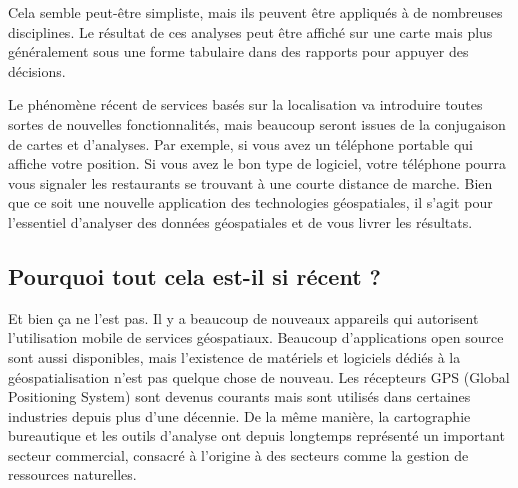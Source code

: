 Cela semble peut-\^etre simpliste, mais ils peuvent \^etre appliqu\'es \`a de nombreuses disciplines. Le r\'esultat de ces analyses peut \^etre affich\'e sur une carte mais plus g\'en\'eralement sous une forme tabulaire dans des rapports pour appuyer des d\'ecisions.

Le ph\'enom\`ene r\'ecent de services bas\'es sur la localisation va introduire toutes sortes de nouvelles fonctionnalit\'es, mais beaucoup seront issues de la conjugaison de cartes et d'analyses. Par exemple, si vous avez un t\'el\'ephone portable qui affiche votre position. Si vous avez le bon type de logiciel, votre t\'el\'ephone pourra vous signaler les restaurants se trouvant \`a une courte distance de marche. Bien que ce soit une nouvelle application des technologies g\'eospatiales, il s'agit pour l'essentiel d'analyser des donn\'ees g\'eospatiales et de vous livrer les r\'esultats.

	
%
%
%

\subsection{Pourquoi tout cela est-il si r\'ecent ?}\label{label_whynew}
Et bien \c{c}a ne l'est pas. Il y a beaucoup de nouveaux appareils qui autorisent l'utilisation mobile de services g\'eospatiaux. Beaucoup d'applications open source sont aussi disponibles, mais l'existence de mat\'eriels et logiciels d\'edi\'es \`a la g\'eospatialisation n'est pas quelque chose de nouveau. Les r\'ecepteurs GPS (Global Positioning System) sont devenus courants mais sont utilis\'es dans certaines industries depuis plus d'une d\'ecennie. De la m\^eme mani\`ere, la cartographie bureautique et les outils d'analyse ont depuis longtemps repr\'esent\'e un important secteur commercial, consacr\'e \`a l'origine \`a des secteurs comme la gestion de ressources naturelles.

